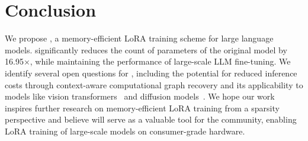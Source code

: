 \section{Conclusion}
We propose \method, a memory-efficient LoRA training scheme for large language models. \method significantly reduces the count of parameters of the original model by 16.95$\times$, while maintaining the performance of large-scale LLM fine-tuning.
We identify several open questions for \method, including the potential for reduced inference costs through context-aware computational graph recovery and its applicability to models like vision transformers~\citep{DosovitskiyB0WZ21} and diffusion models~\citep{HoJA20}. We hope our work inspires further research on memory-efficient LoRA training from a sparsity perspective and believe \method will serve as a valuable tool for the community, enabling LoRA training of large-scale models on consumer-grade hardware.
